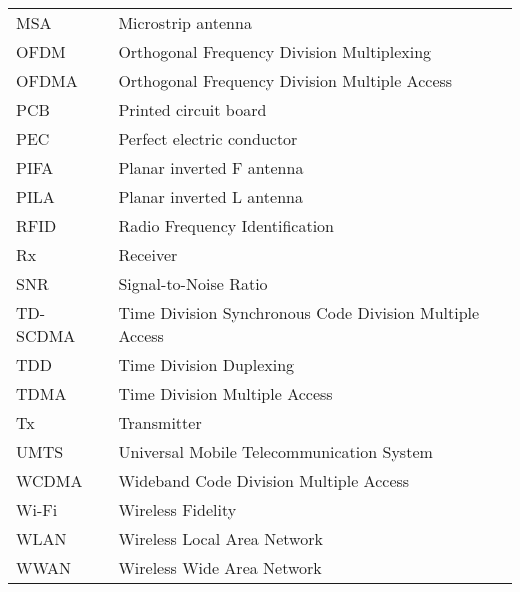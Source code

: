 \begin{tabular}{ll}
MSA         & Microstrip antenna\\
OFDM        & Orthogonal Frequency Division Multiplexing \\
OFDMA       & Orthogonal Frequency Division Multiple Access\\
PCB         & Printed circuit board\\
PEC         & Perfect electric conductor\\
PIFA        & Planar inverted F antenna\\
PILA        & Planar inverted L antenna\\
RFID        & Radio Frequency Identification \\
Rx          & Receiver \\
SNR         & Signal-to-Noise Ratio \\
TD-SCDMA    & Time Division Synchronous Code Division Multiple Access \\
TDD         & Time Division Duplexing \\
TDMA        & Time Division Multiple Access \\
Tx          & Transmitter \\
UMTS        & Universal Mobile Telecommunication System \\
WCDMA       & Wideband Code Division Multiple Access \\
Wi-Fi       & Wireless Fidelity \\
WLAN        & Wireless Local Area Network \\
WWAN        & Wireless Wide Area Network\\
\end{tabular}
